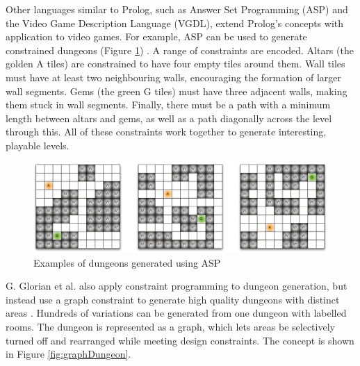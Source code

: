 Other languages similar to Prolog, such as Answer Set Programming (ASP) and the Video Game Description Language (VGDL), extend Prolog's concepts with application to video games. For example, ASP can be used to generate constrained dungeons (Figure \ref{fig:aspDungeons}) \cite{pcgbook}. A range of constraints are encoded. Altars (the golden A tiles) are constrained to have four empty tiles around them. Wall tiles must have at least two neighbouring walls, encouraging the formation of larger wall segments. Gems (the green G tiles) must have three adjacent walls, making them stuck in wall segments. Finally, there must be a path with a minimum length between altars and gems, as well as a path diagonally across the level through this. All of these constraints work together to generate interesting, playable levels.

\begin{figure}[H]
    \centering
    \includegraphics[width=\textwidth, height=0.3\textheight, keepaspectratio]{Images/ASPDungeons.png}
    \caption{Examples of dungeons generated using ASP \cite{pcgbook}}
    \label{fig:aspDungeons}
\end{figure}

G. Glorian et al. also apply constraint programming to dungeon generation, but instead use a graph constraint to generate high quality dungeons with distinct areas \cite{Graph_Constraint_Dungeon}. Hundreds of variations can be generated from one dungeon with labelled rooms. The dungeon is represented as a graph, which lets areas be selectively turned off and rearranged while meeting design constraints. The concept is shown in Figure \ref{fig:graphDungeon}.

